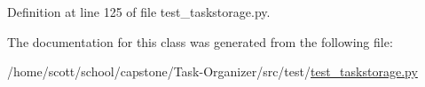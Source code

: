 \-Definition at line 125 of file test\-\_\-taskstorage.\-py.



\-The documentation for this class was generated from the following file\-:\begin{DoxyCompactItemize}
\item 
/home/scott/school/capstone/\-Task-\/\-Organizer/src/test/\hyperlink{test__taskstorage_8py}{test\-\_\-taskstorage.\-py}\end{DoxyCompactItemize}

